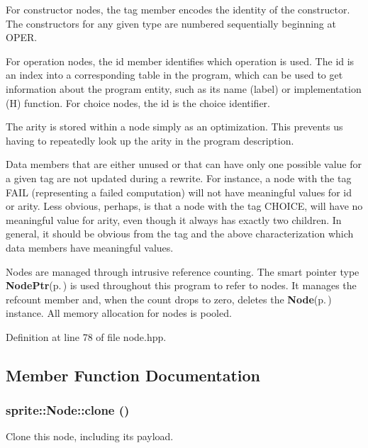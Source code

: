 For constructor nodes, the tag member encodes the identity of the constructor. The constructors for any given type are numbered sequentially beginning at OPER.

For operation nodes, the id member identifies which operation is used. The id is an index into a corresponding table in the program, which can be used to get information about the program entity, such as its name (label) or implementation (H) function. For choice nodes, the id is the choice identifier.

The arity is stored within a node simply as an optimization. This prevents us having to repeatedly look up the arity in the program description.

Data members that are either unused or that can have only one possible value for a given tag are not updated during a rewrite. For instance, a node with the tag FAIL (representing a failed computation) will not have meaningful values for id or arity. Less obvious, perhaps, is that a node with the tag CHOICE, will have no meaningful value for arity, even though it always has exactly two children. In general, it should be obvious from the tag and the above characterization which data members have meaningful values.

Nodes are managed through intrusive reference counting. The smart pointer type {\bf Node\-Ptr}{\rm (p.\,\pageref{structsprite_1_1NodePtr})} is used throughout this program to refer to nodes. It manages the refcount member and, when the count drops to zero, deletes the {\bf Node}{\rm (p.\,\pageref{structsprite_1_1Node})} instance. All memory allocation for nodes is pooled. 



Definition at line 78 of file node.hpp.

\subsection{Member Function Documentation}
\subsubsection{ sprite::Node::clone ()\hspace{0.3cm}{\tt  [inline]}}\label{structsprite_1_1Node_a4}


Clone this node, including its payload. 

